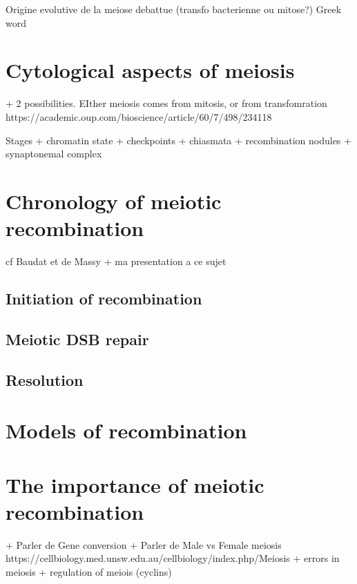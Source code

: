 Origine evolutive de la meiose debattue (transfo bacterienne ou mitose?)
Greek word






\section{Cytological aspects of meiosis}
+ 2 possibilities. EIther meiosis comes from mitosis, or from transfomration https://academic.oup.com/bioscience/article/60/7/498/234118

Stages + chromatin state + checkpoints + chiasmata + recombination nodules + synaptonemal complex

\section{Chronology of meiotic recombination}
cf Baudat et de Massy + ma presentation a ce sujet
\subsection{Initiation of recombination}
\subsection{Meiotic DSB repair}
\subsection{Resolution}

\section{Models of recombination}

\section{The importance of meiotic recombination}


+ Parler de Gene conversion
+ Parler de Male vs Female meiosis  https://cellbiology.med.unsw.edu.au/cellbiology/index.php/Meiosis
+ errors in meiosis
+ regulation of meiois (cyclins)






